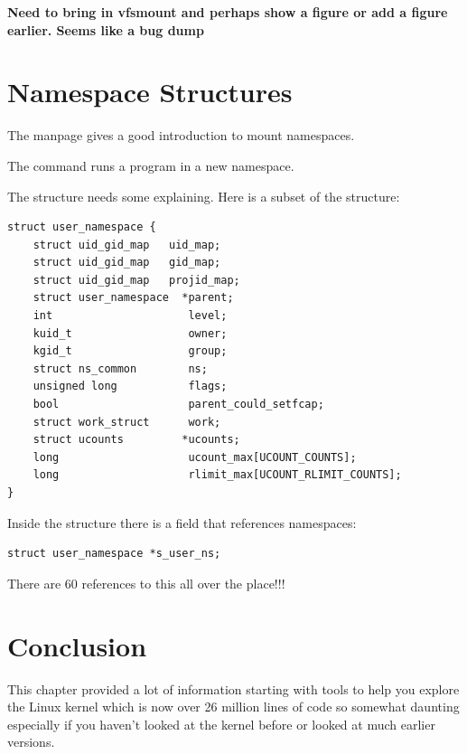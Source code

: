 \noindent
\textbf{Need to bring in vfsmount and perhaps show a figure or add a figure earlier. Seems like a bug dump}


\section{Namespace Structures}


The  manpage gives a good introduction to mount namespaces. 

The  command runs a program in a new namespace. 

The  structure needs some explaining. Here is a subset of the structure:

\begin{lstlisting}
struct user_namespace {
    struct uid_gid_map   uid_map;
    struct uid_gid_map   gid_map;
    struct uid_gid_map   projid_map;
    struct user_namespace  *parent;
    int                     level;
    kuid_t                  owner;
    kgid_t                  group;
    struct ns_common        ns;
    unsigned long           flags;
    bool                    parent_could_setfcap;
    struct work_struct      work;
    struct ucounts         *ucounts;
    long                    ucount_max[UCOUNT_COUNTS];
    long                    rlimit_max[UCOUNT_RLIMIT_COUNTS];
}
\end{lstlisting}

\noindent
Inside the  structure there is a field that references namespaces:

\begin{lstlisting}
struct user_namespace *s_user_ns;
\end{lstlisting}

\noindent
There are 60 references to this all over the place!!!


\section{Conclusion}

This chapter provided a lot of information starting with tools to help you explore the Linux kernel which is now over 26 million lines of code so somewhat daunting especially if you haven't looked at the kernel before or looked at much earlier versions.


